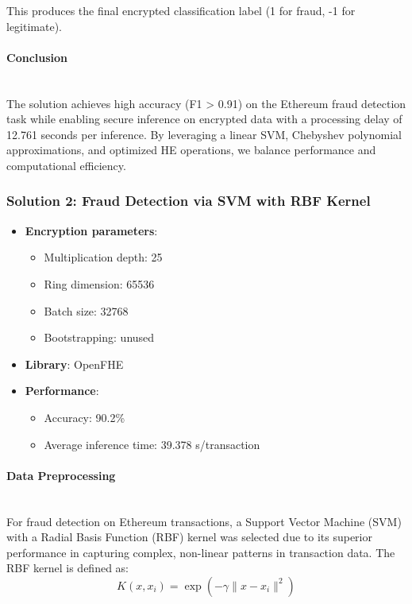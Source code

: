 \documentclass[article]{iacrtrans}
\begin{document}
This produces the final encrypted classification label (1 for fraud, -1 for legitimate).

\paragraph{Conclusion}\mbox{}\\

The solution achieves high accuracy (F1 > 0.91) on the Ethereum fraud detection task while enabling secure inference on encrypted data with a processing delay of 12.761 seconds per inference. By leveraging a linear SVM, Chebyshev polynomial approximations, and optimized HE operations, we balance performance and computational efficiency.

\subsubsection{Solution 2: Fraud Detection via SVM with RBF Kernel}

\begin{itemize}
    \item \textbf{Encryption parameters}: 
        \begin{itemize}
            \item Multiplication depth: 25
            \item Ring dimension: 65536
            \item Batch size: 32768
            \item Bootstrapping: unused
        \end{itemize}
    \item \textbf{Library}: OpenFHE \cite{OpenFHE}
    \item \textbf{Performance}: 
        \begin{itemize}
            \item Accuracy: 90.2\%
            \item Average inference time: 39.378 s/transaction
        \end{itemize}
\end{itemize}


\paragraph{Data Preprocessing}\mbox{}\\

For fraud detection on Ethereum transactions, a Support Vector Machine (SVM) with a Radial Basis Function (RBF) kernel was selected due to its superior performance in capturing complex, non-linear patterns in transaction data. The RBF kernel is defined as:
\[
K(x, x_i) = \exp\left(-\gamma \lVert x - x_i \rVert^2\right)
\]
\end{document}
